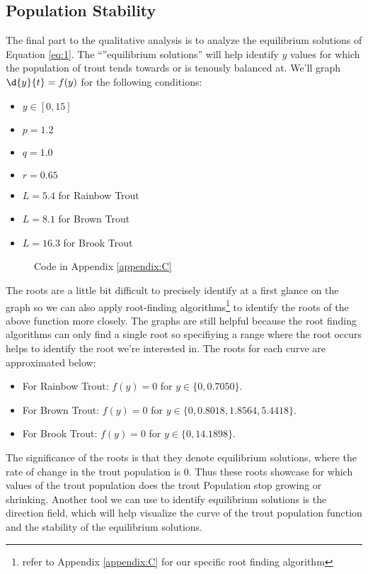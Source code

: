 \documentclass[letterpaper,12pt]{article}
\begin{document}
\subsection{Population Stability}
The final part to the qualitative analysis is to analyze the equilibrium solutions of Equation \eqref{eq:1}. The ``''equilibrium solutions'' will help identify \(y\) values for which the population of trout tends towards or is tenously balanced at. We'll graph \(\d{y}{t} = f(y)\) for the following conditions:
\begin{itemize}
    \item \(y \in [0, 15]\)
    \item \(p = 1.2\)
    \item \(q = 1.0\)
    \item \(r = 0.65\)
    \item \(L = 5.4\) for Rainbow Trout
    \item \(L = 8.1\) for Brown Trout
    \item \(L = 16.3\) for Brook Trout
\end{itemize}
\begin{figure}[H]
    \centering
    
    \caption{Code in Appendix \ref{appendix:C}}
    \label{fig:3}
\end{figure}
The roots are a little bit difficult to precisely identify at a first glance on the graph so we can also apply root-finding algorithms\footnote{refer to Appendix \ref{appendix:C} for our specific root finding algorithm} to identify the roots of the above function more closely. 
The graphs are still helpful because the root finding algorithms can only find a single root so specifiying a range where the root occurs helps to identify the root we're interested in.
The roots for each curve are approximated below:
\begin{itemize}
    \item For Rainbow Trout: \(f(y) = 0\) for \(y \in \{0, 0.7050\}\).
    \item For Brown Trout: \(f(y) = 0\) for \(y \in \{0, 0.8018, 1.8564, 5.4418\}\).
    \item For Brook Trout: \(f(y) = 0\) for \(y \in \{0, 14.1898\}\).
\end{itemize}
The significance of the roots is that they denote equilibrium solutions, where the rate of change in the trout population is 0.
Thus these roots showcase for which values of the trout population does the trout Population stop growing or shrinking.
Another tool we can use to identify equilibrium solutions is the direction field, which will help visualize the curve of the trout population function and the stability of the equilibrium solutions.
\end{document}
